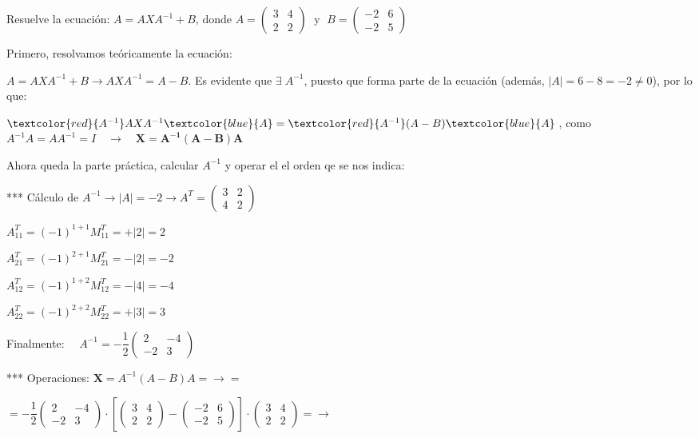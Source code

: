 \begin{ejre}
   Resuelve la ecuación: $A=AXA^{-1}+B$, donde 
   $A=\left( \begin{matrix}  
   3&4 \\ 2&2 \end{matrix} \right) \;  \text{ y }
    \; B=\left( \begin{matrix} -2&6\\-2&5  \end{matrix} \right)$
\end{ejre}

\begin{proofw}\renewcommand{\qedsymbol}{$\diamond$}
	Primero, resolvamos teóricamente la ecuación:
	
	$A=AXA^{-1}+B \to AXA^{-1}=A-B$. Es evidente que $\exists \; A^{-1}$, puesto que forma parte de la ecuación (además, $|A|=6-8=-2\neq 0$), por lo que:
	
	$\textcolor{red}{A^{-1}}AXA^{-1}\textcolor{blue}{A}=\textcolor{red}{A^{-1}}(A-B)\textcolor{blue}{A}\; $, como $A^{-1}A=AA^{-1}=I \quad \to \quad \boldsymbol{X=A^{-1}(A-B)A}$
	
	Ahora queda la parte práctica, calcular $A^{-1}$ y operar el el orden qe se nos indica:
	
	*** Cálculo de $A^{-1} \to |A|=-2 \to A^T=\left( \begin{matrix}  
   3&2\\4&2 \end{matrix} \right)$
   
   \begin{multicols}{2}
   \noindent $A^T_{11}=(-1)^{1+1}M^T_{11}=+|2|=2$
   
   \noindent $A^T_{21}=(-1)^{2+1}M^T_{21}=-|2|=-2$
   
   \noindent $A^T_{12}=(-1)^{1+2}M^T_{12}=-|4|=-4$
   
   \noindent $A^T_{22}=(-1)^{2+2}M^T_{22}=+|3|=3$
   \end{multicols}

Finalmente: $\quad A^{-1}=-\dfrac 1 2   \left( \begin{matrix}  
   2&-4\\-2&3 \end{matrix} \right)$
   
   *** Operaciones: $\boldsymbol{X}=A^{-1}(A-B)A= \to=$
 
 $ =-\dfrac 1 2   \left( \begin{matrix}  
   2&-4\\-2&3 \end{matrix} \right)\cdot \left[
   \left( \begin{matrix}    
   3&4 \\ 2&2 \end{matrix} \right)
 - \left( \begin{matrix} -2&6\\-2&5  \end{matrix} \right)
   \right] \cdot 
    \left( \begin{matrix}  
   3&4 \\ 2&2 \end{matrix} \right) = \to $
   

\end{proofw}
